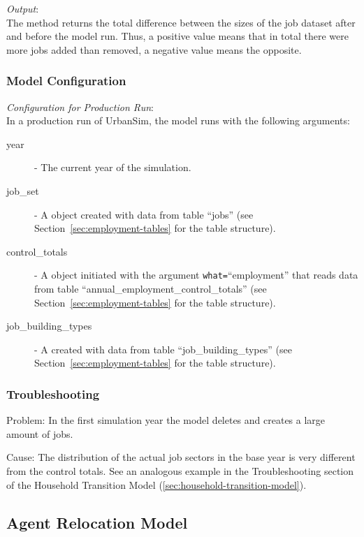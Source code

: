 {\it Output}:~\\[1mm]
The method returns the total difference between the sizes of the job
dataset \datasetindex after and before the model \modelsindex run. Thus, a positive value means that in
total there were more jobs added than removed, a negative value means
the opposite.

\subsubsection{Model Configuration}
\modelsindex
%
{\em Configuration for Production Run}:\\[1mm]
In a production run of UrbanSim, the model \modelsindex runs with the following arguments:
\begin{description}
\item[year] - The current year of the simulation.
\item[job_set] - A  object created with data from
  table ``jobs'' (see Section~\ref{sec:employment-tables}
  for the table structure).
\item[control_totals] - A  object initiated with the
  argument \verb|what=|``employment'' that reads data from table
  ``annual_employment_control_totals'' (see
  Section~\ref{sec:employment-tables} for the table structure).
\item[job_building_types] - A  created with data from table 
``job_building_types'' (see Section~\ref{sec:employment-tables}
  for the table structure).
\end{description}

\subsubsection{Troubleshooting}
%
\begin{description}
\item{Problem:} In the first simulation year the model deletes and creates a large amount of jobs.
\item{Cause:} The distribution of the actual job sectors in the base year is very different 
from the control totals. See an analogous example in the Troubleshooting section of the Household Transition 
Model (\ref{sec:household-transition-model}).
\end{description}

%
\subsection{Agent Relocation Model}
\modelsindex
%
\label{sec:agent-relocation-model}


